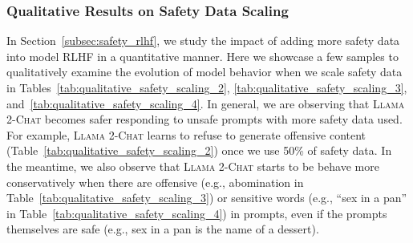 \documentclass{article}
\newcommand{\modelname}{\textsc{Llama 2-Chat}\xspace}
\begin{document}
\subsubsection{Qualitative Results on Safety Data Scaling}
\label{sec:qualitative_results_safety_scaling}

In Section~\ref{subsec:safety_rlhf}, we study the impact of adding more safety data into model RLHF in a quantitative manner. Here we showcase a few samples to qualitatively examine the evolution of model behavior when we scale safety data in Tables~\ref{tab:qualitative_safety_scaling_2}, \ref{tab:qualitative_safety_scaling_3}, and~\ref{tab:qualitative_safety_scaling_4}. In general, we are observing that \modelname becomes safer responding to unsafe prompts with more safety data used. For example, \modelname learns to refuse to generate offensive content (Table~\ref{tab:qualitative_safety_scaling_2}) once we use 50\% of safety data. In the meantime, we also observe that \modelname starts to be behave more conservatively when there are offensive (e.g., abomination in Table~\ref{tab:qualitative_safety_scaling_3}) or sensitive words (e.g., ``sex in a pan'' in Table~\ref{tab:qualitative_safety_scaling_4}) in prompts, even if the prompts themselves are safe (e.g., sex in a pan is the name of a dessert).
\end{document}
